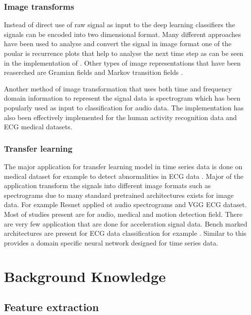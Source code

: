       \subsection{Image transforms}
      Instead of direct use of raw signal as input to the deep learning classifiers the signals can be encoded into two dimensional format. Many different approaches have been used to analyse and convert the signal in image format one of the poular is recurrence plots that help to analyse the next time step as can be seen in the implementation of \cite{thanaraj2020implementation}. Other types of image representations that have been reaserched are Gramian fields and  Markov transition fields \cite{wang2015imaging}.
      
      Another method of image transformation that uses both time and frequency domain information to represent the signal data is spectrogram which has been popularly used as input to classification for audio data. The implementation has also been effectively implemented for the human activity recognition data and ECG medical datasets.
      

   \subsection{Transfer learning}
  
  The major application for transfer learning model in time series data is done on medical dataset for example to detect abnormalities in ECG data \cite{o2021deep}. Major of the application transform  the signals into different image formats such as spectrograms due to many standard pretrained architectures exists for image data. For example Resnet \cite{ouyang2017audio} applied ot audio spectrograms and VGG \cite{russo2019classification} ECG dataset. 
  Most of studies present are for audio, medical and motion detection field. There are very few application that are done for acceleration signal data. Bench marked architectures are present for ECG data classification for example \cite{strodthoff2020deep}. Similar to this \cite{yosinski2014transferable} provides a domain specific neural network designed for time series data.

  
  
    
    \chapter{Background Knowledge}
     \section{Feature extraction}
  
